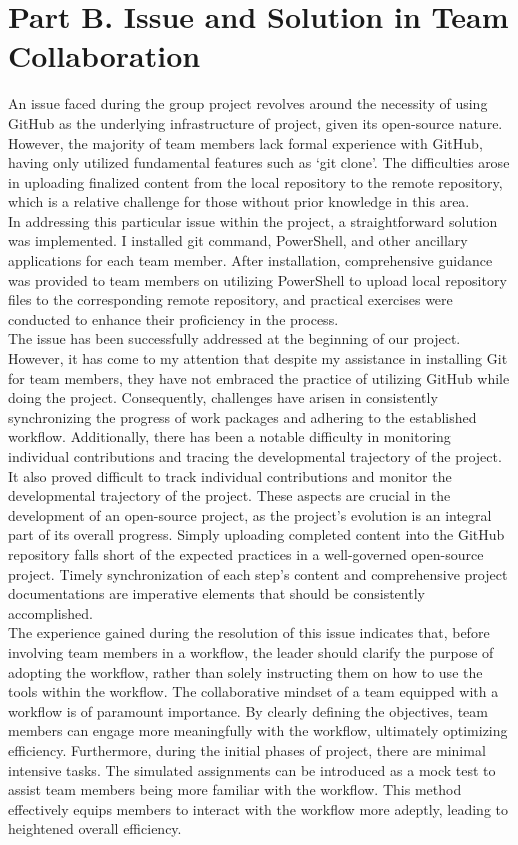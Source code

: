\documentclass[11pt]{report} %
\begin{document}
\section*{Part B. Issue and Solution in Team Collaboration} 
\vspace{-3mm}
An issue faced during the group project revolves around the necessity of using GitHub as the underlying infrastructure of project, 
given its open-source nature. However, the majority of team members lack formal experience with GitHub, having only utilized 
fundamental features such as `git clone'. The difficulties arose in uploading finalized content from the local repository to the 
remote repository, which is a relative challenge for those without prior knowledge in this area. \\
In addressing this particular issue within the project, a straightforward solution was implemented. I installed git command, 
PowerShell, and other ancillary applications for each team member. After installation, comprehensive guidance was provided to 
team members on utilizing PowerShell to upload local repository files to the corresponding remote repository, and practical 
exercises were conducted to enhance their proficiency in the process. \\
The issue has been successfully addressed at the beginning of our project. However, it has come to my attention that despite my 
assistance in installing Git for team members, they have not embraced the practice of utilizing GitHub while doing the project. 
Consequently, challenges have arisen in consistently synchronizing the progress of work packages and adhering to the established 
workflow. Additionally, there has been a notable difficulty in monitoring individual contributions and tracing the developmental 
trajectory of the project. It also proved difficult to track individual contributions and monitor the developmental trajectory of 
the project. These aspects are crucial in the development of an open-source project, as the project's evolution is an integral part 
of its overall progress. Simply uploading completed content into the GitHub repository falls short of the expected practices in a 
well-governed open-source project. Timely synchronization of each step's content and comprehensive project documentations are 
imperative elements that should be consistently accomplished. \\
The experience gained during the resolution of this issue indicates that, before involving team members in a workflow, the leader 
should clarify the purpose of adopting the workflow, rather than solely instructing them on how to use the tools within the workflow. 
The collaborative mindset of a team equipped with a workflow is of paramount importance. By clearly defining the objectives, team 
members can engage more meaningfully with the workflow, ultimately optimizing efficiency. Furthermore, during the initial phases of 
project, there are minimal intensive tasks. The simulated assignments can be introduced as a mock test to assist team members being 
more familiar with the workflow. This method effectively equips members to interact with the workflow more adeptly, leading to heightened 
overall efficiency.



\end{document}

